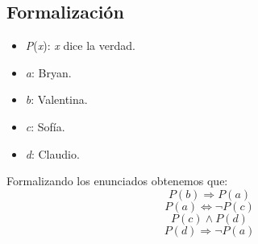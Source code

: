 \documentclass[letterpaper,10pt]{article}
\begin{document}
\subsection{Formalizaci\'on}
\begin{minipage}[t]{0.4\textwidth}
\begin{itemize}
    \item \textit{P}(\textit{x}): \textit{x} dice la verdad.
    \item \textit{a}: Bryan.
    \item \textit{b}: Valentina.
    \item \textit{c}: Sof\'ia.
    \item \textit{d}: Claudio.
\end{itemize}
\end{minipage}
\begin{minipage}[t]{0.5\textwidth}
Formalizando los enunciados obtenemos que:
\begin{equation}
    P(b) \Rightarrow P(a)
\end{equation}
\begin{equation}
    P(a) \Leftrightarrow \neg P(c)
\end{equation}
\begin{equation}
    P(c) \wedge  P(d)
\end{equation}
\begin{equation}
    P(d) \Rightarrow \neg P(a)
\end{equation}
\end{minipage}
\end{document}
